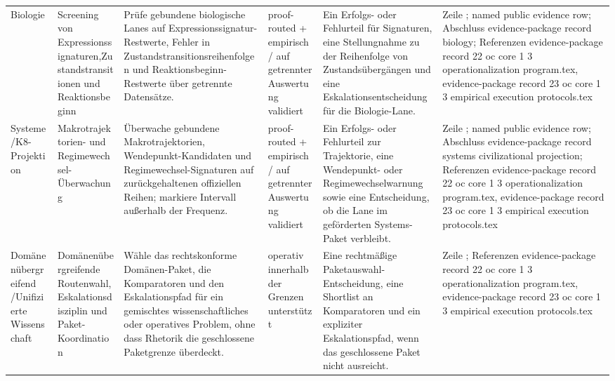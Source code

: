 \begin{longtable}{@{}L{0.11\textwidth}L{0.16\textwidth}L{0.19\textwidth}L{0.12\textwidth}L{0.18\textwidth}L{0.16\textwidth}@{}}
Biologie & Screening von Expressionssignaturen,\allowbreak Zustandstransitionen und Reaktionsbeginn & Prüfe gebundene biologische Lanes auf Expressionssignatur-Restwerte, Fehler in Zustandstransitionsreihenfolgen und Reaktionsbeginn-Restwerte über getrennte Datensätze. & proof-routed + empirisch / auf getrennter Auswertung validiert & Ein Erfolgs- oder Fehlurteil für Signaturen, eine Stellungnahme zu der Reihenfolge von Zustandsübergängen und eine Eskalationsentscheidung für die Biologie-Lane. & Zeile ; named public evidence row; \allowbreak Abschluss evidence-package record biology; \allowbreak Referenzen evidence-package record 22 oc core 1 3 operationalization program.tex, \allowbreak evidence-package record 23 oc core 1 3 empirical execution protocols.tex \\
Systeme /\allowbreak K8-Projektion & Makrotrajektorien- und Regimewechsel-Überwachung & Überwache gebundene Makrotrajektorien, Wendepunkt-Kandidaten und Regimewechsel-Signaturen auf zurückgehaltenen offiziellen Reihen; markiere Intervall außerhalb der Frequenz. & proof-routed + empirisch / auf getrennter Auswertung validiert & Ein Erfolgs- oder Fehlurteil zur Trajektorie, eine Wendepunkt- oder Regimewechselwarnung sowie eine Entscheidung, ob die Lane im geförderten Systems-Paket verbleibt. & Zeile ; named public evidence row; \allowbreak Abschluss evidence-package record systems civilizational projection; \allowbreak Referenzen evidence-package record 22 oc core 1 3 operationalization program.tex, \allowbreak evidence-package record 23 oc core 1 3 empirical execution protocols.tex \\
Domänenübergreifend /\allowbreak Unifizierte Wissenschaft & Domänenübergreifende Routenwahl, Eskalationsdisziplin und Paket-Koordination & Wähle das rechtskonforme Domänen-Paket, die Komparatoren und den Eskalationspfad für ein gemischtes wissenschaftliches oder operatives Problem, ohne dass Rhetorik die geschlossene Paketgrenze überdeckt. & operativ innerhalb der Grenzen unterstützt & Eine rechtmäßige Paketauswahl-Entscheidung, eine Shortlist an Komparatoren und ein expliziter Eskalationspfad, wenn das geschlossene Paket nicht ausreicht. & Zeile ; \allowbreak Referenzen evidence-package record 22 oc core 1 3 operationalization program.tex, \allowbreak evidence-package record 23 oc core 1 3 empirical execution protocols.tex \\
\bottomrule
\end{longtable}
\endgroup

